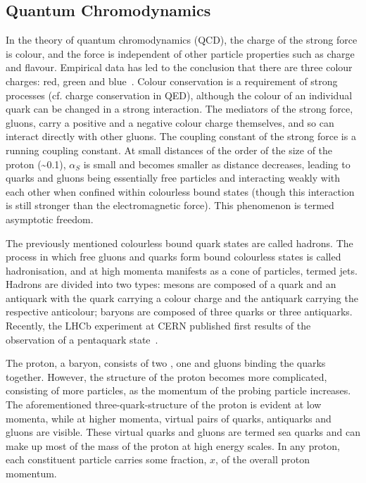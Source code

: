 \subsection{Quantum Chromodynamics}
\label{ss:quantum_chromodynamics}

In the theory of quantum chromodynamics (QCD), the charge of the strong force is colour, and the force is
independent of other particle properties such as charge and flavour. Empirical data has led to the conclusion
that there are three colour charges: red, green and blue~\cite{Griffiths:1987tj}. Colour conservation is a
requirement of strong processes (cf. charge conservation in QED), although the colour of an individual quark
can be changed in a strong interaction. The mediators of the strong force, gluons, carry a positive and a
negative colour charge themselves, and so can interact directly with other gluons. The coupling constant of
the strong force is a running coupling constant. At small distances of the order of the size of the proton
(\textasciitilde0.1\fm), $\alpha_{S}$ is small and becomes smaller as distance decreases, leading to quarks
and gluons being essentially free particles and interacting weakly with each other when confined within
colourless bound states (though this interaction is still stronger than the electromagnetic force). This
phenomenon is termed asymptotic freedom.

The previously mentioned colourless bound quark states are called hadrons. The process in which free gluons
and quarks form bound colourless states is called hadronisation, and at high momenta manifests as a cone of
particles, termed jets. Hadrons are divided into two types: mesons are composed of a quark and an antiquark
with the quark carrying a colour charge and the antiquark carrying the respective anticolour; baryons are
composed of three quarks or three antiquarks. Recently, the LHCb experiment at CERN published first results of
the observation of a pentaquark state~\cite{Aaij:2015tga}.

The proton, a baryon, consists of two \uquarks, one \dquark and gluons binding the quarks together. However,
the structure of the proton becomes more complicated, consisting of more particles, as the momentum of the
probing particle increases. The aforementioned three-quark-structure of the proton is evident at low momenta,
while at higher momenta, virtual pairs of quarks, antiquarks and gluons are visible. These virtual quarks and
gluons are termed sea quarks and can make up most of the mass of the proton at high energy scales. In any
proton, each constituent particle carries some fraction, $x$, of the overall proton momentum.

